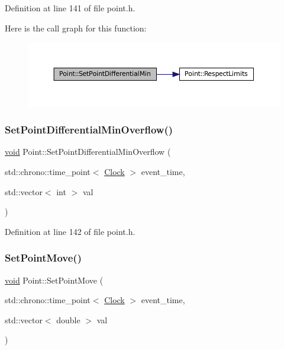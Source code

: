 Definition at line 141 of file point.\+h.

Here is the call graph for this function\+:\nopagebreak
\begin{figure}[H]
\begin{center}
\leavevmode
\includegraphics[width=350pt]{class_point_a944fcec52017ce88e052a576ef143926_cgraph}
\end{center}
\end{figure}
\mbox{\label{class_point_a582e63ebdbb0979234acb460e673a393}} 
\subsubsection{\texorpdfstring{Set\+Point\+Differential\+Min\+Overflow()}{SetPointDifferentialMinOverflow()}}
{\footnotesize\ttfamily \mbox{\hyperlink{glad_8h_a950fc91edb4504f62f1c577bf4727c29}{void}} Point\+::\+Set\+Point\+Differential\+Min\+Overflow (\begin{DoxyParamCaption}\item[{std\+::chrono\+::time\+\_\+point$<$ \mbox{\hyperlink{universe_8h_a0ef8d951d1ca5ab3cfaf7ab4c7a6fd80}{Clock}} $>$}]{event\+\_\+time,  }\item[{std\+::vector$<$ int $>$}]{val }\end{DoxyParamCaption})\hspace{0.3cm}{\ttfamily [inline]}}



Definition at line 142 of file point.\+h.

\mbox{\label{class_point_a2cf44d5cf17ecf2b3385bde963678589}} 
\subsubsection{\texorpdfstring{Set\+Point\+Move()}{SetPointMove()}}
{\footnotesize\ttfamily \mbox{\hyperlink{glad_8h_a950fc91edb4504f62f1c577bf4727c29}{void}} Point\+::\+Set\+Point\+Move (\begin{DoxyParamCaption}\item[{std\+::chrono\+::time\+\_\+point$<$ \mbox{\hyperlink{universe_8h_a0ef8d951d1ca5ab3cfaf7ab4c7a6fd80}{Clock}} $>$}]{event\+\_\+time,  }\item[{std\+::vector$<$ double $>$}]{val }\end{DoxyParamCaption})\hspace{0.3cm}{\ttfamily [inline]}}



